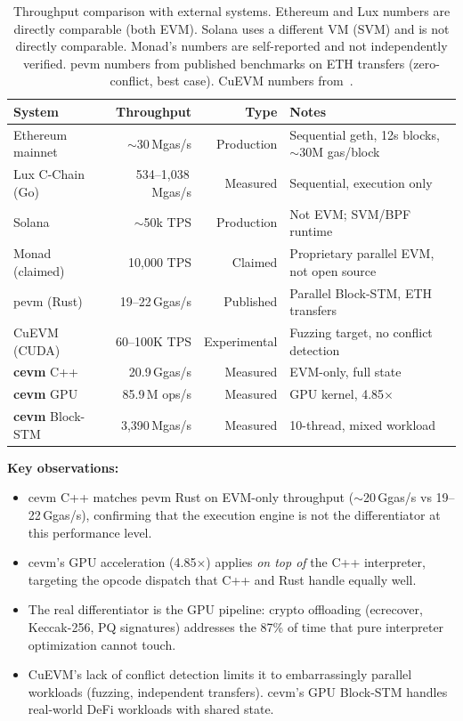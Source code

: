 \begin{table}[h]
\centering
\small
\begin{tabular}{lrrp{4cm}}
\toprule
\textbf{System} & \textbf{Throughput} & \textbf{Type} & \textbf{Notes} \\
\midrule
Ethereum mainnet    & $\sim$30\,Mgas/s     & Production & Sequential geth, 12s blocks, $\sim$30M gas/block \\
Lux C-Chain (Go)    & 534--1{,}038\,Mgas/s & Measured   & Sequential, execution only \\
Solana              & $\sim$50k TPS        & Production & Not EVM; SVM/BPF runtime \\
Monad (claimed)     & 10{,}000 TPS         & Claimed    & Proprietary parallel EVM, not open source \\
pevm (Rust)         & 19--22\,Ggas/s       & Published  & Parallel Block-STM, ETH transfers \\
CuEVM (CUDA)        & 60--100K TPS         & Experimental & Fuzzing target, no conflict detection \\
\midrule
\textbf{cevm} C++   & 20.9\,Ggas/s        & Measured   & EVM-only, full state \\
\textbf{cevm} GPU   & 85.9\,M ops/s       & Measured   & GPU kernel, 4.85$\times$ \\
\textbf{cevm} Block-STM & 3{,}390\,Mgas/s & Measured   & 10-thread, mixed workload \\
\bottomrule
\end{tabular}
\caption{Throughput comparison with external systems. Ethereum and Lux numbers are
directly comparable (both EVM). Solana uses a different VM (SVM) and is not directly
comparable. Monad's numbers are self-reported and not independently verified.
pevm numbers from published benchmarks on ETH transfers (zero-conflict, best case).
CuEVM numbers from~\cite{cuevm}.}
\label{tab:external}
\end{table}

\textbf{Key observations:}
\begin{itemize}
\item cevm C++ matches pevm Rust on EVM-only throughput ($\sim$20\,Ggas/s vs 19--22\,Ggas/s),
      confirming that the execution engine is not the differentiator at this performance level.
\item cevm's GPU acceleration (4.85$\times$) applies \emph{on top of} the C++ interpreter,
      targeting the opcode dispatch that C++ and Rust handle equally well.
\item The real differentiator is the GPU pipeline: crypto offloading (ecrecover, Keccak-256,
      PQ signatures) addresses the 87\% of time that pure interpreter optimization cannot touch.
\item CuEVM's lack of conflict detection limits it to embarrassingly parallel workloads
      (fuzzing, independent transfers). cevm's GPU Block-STM handles real-world DeFi workloads
      with shared state.
\end{itemize}

